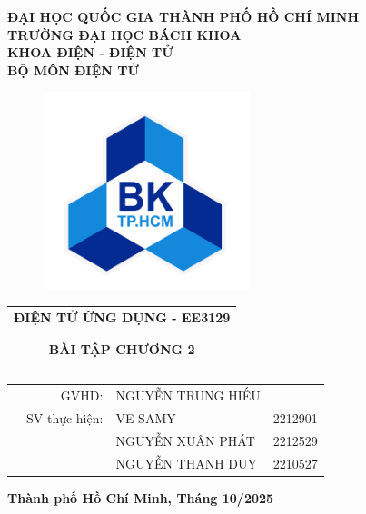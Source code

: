 \documentclass[11pt, a4paper, fleqn]{article}
\begin{document}
\large
\begin{titlepage}
\begin{center}
\textbf{\large ĐẠI HỌC QUỐC GIA THÀNH PHỐ HỒ CHÍ MINH} \\
\textbf{\large TRƯỜNG ĐẠI HỌC BÁCH KHOA} \\
\textbf{\large KHOA ĐIỆN - ĐIỆN TỬ} \\
\textbf{\large BỘ MÔN ĐIỆN TỬ} 
\end{center}
\begin{figure}[h!]
\begin{center}
\includegraphics[width=6cm]{image/hcmut.png}
\end{center}
\end{figure}

\vspace{0.5cm}
\begin{center}
\begin{tabular}{c}
{\textbf{{\Large ĐIỆN TỬ ỨNG DỤNG - EE3129}}}\\\\
\hline \\
\textbf{\large BÀI TẬP CHƯƠNG 2} \\
\\
\hline \\
\end{tabular}
\end{center}

\vspace{0.5cm}

\begin{table}[h]
\begin{tabular}{rrlr}
\hspace{4 cm} & \large GVHD: & \large NGUYỄN TRUNG HIẾU \vspace{0.5cm}\\

& \large SV thực hiện: &\large VE SAMY & 2212901\\
&&\large NGUYỄN XUÂN PHÁT & 2212529\\
&&\large NGUYỄN THANH DUY & 2210527\\

\end{tabular}
\end{table}
\vspace{3cm}
\begin{center}
{\bf Thành phố Hồ Chí Minh, Tháng 10/2025}
\end{center}
\end{titlepage}
\end{document}
